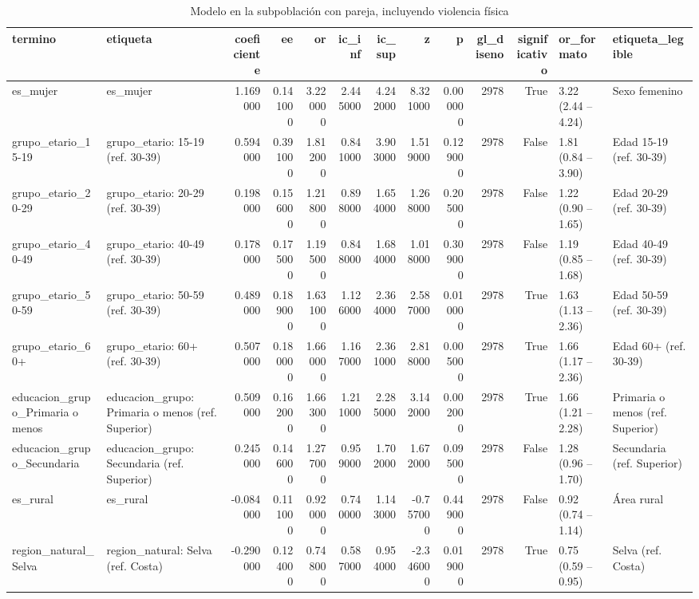\begin{table}[htbp]
\caption{Modelo en la subpoblación con pareja, incluyendo violencia física}
\label{tab:tabla_27_modelo_subpoblacion_violencia}
\begin{tabular}{llrrrrrrrrrll}
\toprule
termino & etiqueta & coeficiente & ee & or & ic\_inf & ic\_sup & z & p & gl\_diseno & significativo & or\_formato & etiqueta\_legible \\
\midrule
es\_mujer & es\_mujer & 1.169000 & 0.141000 & 3.220000 & 2.445000 & 4.242000 & 8.321000 & 0.000000 & 2978 & True & 3.22 (2.44 – 4.24) & Sexo femenino \\
grupo\_etario\_15-19 & grupo\_etario: 15-19 (ref. 30-39) & 0.594000 & 0.391000 & 1.812000 & 0.841000 & 3.903000 & 1.519000 & 0.129000 & 2978 & False & 1.81 (0.84 – 3.90) & Edad 15-19 (ref. 30-39) \\
grupo\_etario\_20-29 & grupo\_etario: 20-29 (ref. 30-39) & 0.198000 & 0.156000 & 1.218000 & 0.898000 & 1.654000 & 1.268000 & 0.205000 & 2978 & False & 1.22 (0.90 – 1.65) & Edad 20-29 (ref. 30-39) \\
grupo\_etario\_40-49 & grupo\_etario: 40-49 (ref. 30-39) & 0.178000 & 0.175000 & 1.195000 & 0.848000 & 1.684000 & 1.018000 & 0.309000 & 2978 & False & 1.19 (0.85 – 1.68) & Edad 40-49 (ref. 30-39) \\
grupo\_etario\_50-59 & grupo\_etario: 50-59 (ref. 30-39) & 0.489000 & 0.189000 & 1.631000 & 1.126000 & 2.364000 & 2.587000 & 0.010000 & 2978 & True & 1.63 (1.13 – 2.36) & Edad 50-59 (ref. 30-39) \\
grupo\_etario\_60+ & grupo\_etario: 60+ (ref. 30-39) & 0.507000 & 0.180000 & 1.660000 & 1.167000 & 2.361000 & 2.818000 & 0.005000 & 2978 & True & 1.66 (1.17 – 2.36) & Edad 60+ (ref. 30-39) \\
educacion\_grupo\_Primaria o menos & educacion\_grupo: Primaria o menos (ref. Superior) & 0.509000 & 0.162000 & 1.663000 & 1.211000 & 2.285000 & 3.142000 & 0.002000 & 2978 & True & 1.66 (1.21 – 2.28) & Primaria o menos (ref. Superior) \\
educacion\_grupo\_Secundaria & educacion\_grupo: Secundaria (ref. Superior) & 0.245000 & 0.146000 & 1.277000 & 0.959000 & 1.702000 & 1.672000 & 0.095000 & 2978 & False & 1.28 (0.96 – 1.70) & Secundaria (ref. Superior) \\
es\_rural & es\_rural & -0.084000 & 0.111000 & 0.920000 & 0.740000 & 1.143000 & -0.757000 & 0.449000 & 2978 & False & 0.92 (0.74 – 1.14) & Área rural \\
region\_natural\_Selva & region\_natural: Selva (ref. Costa) & -0.290000 & 0.124000 & 0.748000 & 0.587000 & 0.954000 & -2.346000 & 0.019000 & 2978 & True & 0.75 (0.59 – 0.95) & Selva (ref. Costa) \\

\end{tabular}
\end{table}
